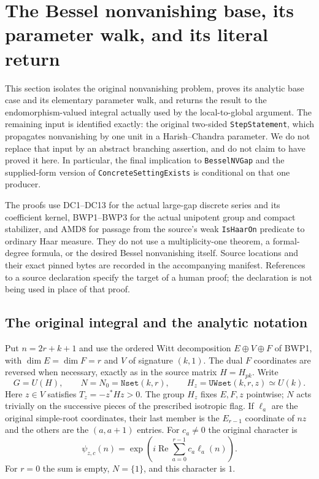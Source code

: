 \section{The Bessel nonvanishing base, its parameter walk, and its literal return}
\label{sec:bessel-nonvanishing-v50}

This section isolates the original nonvanishing problem, proves its analytic
base case and its elementary parameter walk, and returns the result to the
endomorphism-valued integral actually used by the local-to-global argument.
The remaining input is identified exactly: the original two-sided
\texttt{StepStatement}, which propagates nonvanishing by one unit in a
Harish--Chandra parameter.  We do not replace that input by an abstract
branching assertion, and do not claim to have proved it here.  In particular,
the final implication to \texttt{BesselNVGap} and the supplied-form version of
\texttt{ConcreteSettingExists} is conditional on that one producer.

The proofs use DC1--DC13 for the actual large-gap discrete series and its
coefficient kernel, BWP1--BWP3 for the actual unipotent group and compact
stabilizer, and AMD8 for passage from the source's weak \texttt{IsHaarOn}
predicate to ordinary Haar measure.  They do not use a multiplicity-one
theorem, a formal-degree formula, or the desired Bessel nonvanishing itself.
Source locations and their exact pinned bytes are recorded in the accompanying
manifest.  References to a source declaration specify the target of a human
proof; the declaration is not being used in place of that proof.

\subsection{The original integral and the analytic notation}

Put $n=2r+k+1$ and use the ordered Witt decomposition
$E\oplus V\oplus F$ of BWP1, with $\dim E=\dim F=r$ and $V$ of signature
$(k,1)$.  The dual $F$ coordinates are reversed when necessary, exactly as in
the source matrix $H=H_{pk}$.  Write
\[
 G=U(H),\qquad N=N_0=\texttt{Nset}(k,r),\qquad
 H_z=\texttt{UWset}(k,r,z)\simeq U(k).
\]
Here $z\in V$ satisfies $T_z=-z^*Hz>0$.  The group $H_z$ fixes $E,F,z$
pointwise; $N$ acts trivially on the successive pieces of the prescribed
isotropic flag.  If $\ell_a$ are the original simple-root coordinates, their
last member is the $E_{r-1}$ coordinate of $nz$ and the others are the
$(a,a+1)$ entries.  For $c_a\ne0$ the original character is
\[
 \psi_{z,c}(n)=
 \exp\left(i\operatorname{Re}\sum_{a=0}^{r-1}c_a\ell_a(n)\right).
 \tag{BNV.1}
\]
For $r=0$ the sum is empty, $N=\{1\}$, and this character is $1$.

